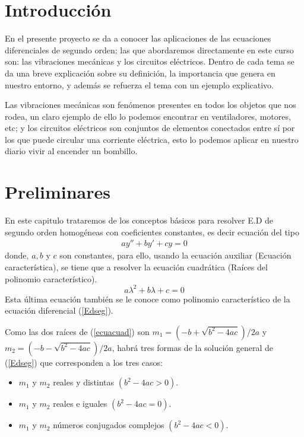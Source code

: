 \documentclass[oneside,12pt]{report}
\begin{document}
\chapter{Introducción}

	En el presente proyecto se da a conocer las aplicaciones de las ecuaciones diferenciales de segundo orden;  las que abordaremos directamente en este curso son:  las vibraciones mecánicas y los circuitos eléctricos. Dentro de cada tema se da una breve explicación sobre su definición, la importancia que genera en nuestro entorno, y además se refuerza el tema con un ejemplo explicativo.
	
	Las vibraciones mecánicas son fenómenos presentes en todos los objetos que nos rodea, un claro ejemplo de ello lo podemos encontrar en ventiladores, motores, etc; y los circuitos eléctricos son conjuntos de elementos conectados entre sí por los que puede circular una corriente eléctrica, esto lo podemos aplicar en nuestro diario vivir al encender un bombillo.
	
	\chapter{Preliminares}
En este capitulo trataremos de los conceptos básicos para resolver E.D de segundo orden  homogéneas con  coeficientes constantes, es decir ecuación del tipo
\begin{eqnarray}\label{Edseg}
	ay''+by'+cy=0
\end{eqnarray}
donde, $a, b$ y $c$ son constantes,  para ello,  usando la ecuación auxiliar (Ecuación característica),  se tiene que a resolver la ecuación cuadrática (Raíces del polinomio característico).
\begin{equation}\label{ecuacuad}
	a\lambda^2+b\lambda+c=0
\end{equation}
Esta última ecuación también se le conoce como polinomio característico de la ecuación diferencial (\ref{Edseg}).

Como las dos raíces de (\ref{ecuacuad}) son $m_1 =(- b+\sqrt{b^2- 4ac})/2a$ y $m_2 =(- b-\sqrt{b^2- 4ac})/2a$, habrá tres formas de la solución general de (\ref{Edseg}) que corresponden a los tres casos:
\begin{itemize}
	\item  $m_1$ y $m_2$ reales y distintas $(b^2-4ac>0)$.
	\item $m_1$ y $m_2$ reales e iguales $(b^2-4ac =0)$.
	\item $m_1$ y $m_2$ números conjugados complejos $(b^2- 4ac 
	<0)$.
\end{itemize}
\end{document}
